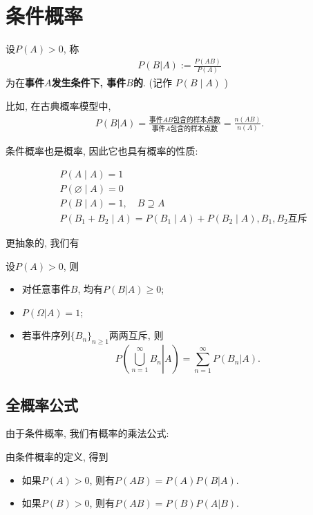 \section{条件概率}

\begin{definition}
    设$P(A)>0$, 称
    \begin{align*}
        P(B|A):=\frac{P(AB)}{P(A)}
    \end{align*}
    为在\textbf{事件$A$发生条件下, 事件$B$的}. (记作 $P(B \mid A)$ )
\end{definition}

比如, 在古典概率模型中, 
\begin{align*}
    P(B|A)=\frac{\mbox{事件$AB$包含的样本点数}}{\mbox{事件$A$包含的样本点数}}=\frac{n(AB)}{n(A)}.
\end{align*}

条件概率也是概率, 因此它也具有概率的性质:

$$
\begin{aligned}
& P(A \mid A)=1 \\
& P(\varnothing \mid A)=0 \\
& P(B \mid A)=1, \quad B \supseteq A \\
& P\left(B_1+B_2 \mid A\right)=P\left(B_1 \mid A\right)+P\left(B_2 \mid A\right), B_1,B_2\text{互斥}
\end{aligned}
$$

更抽象的, 我们有

\begin{proposition}
    设$P(A)>0$, 则
    \begin{itemize}
        \item 对任意事件$B$, 均有$P(B|A)\ge 0$; 
        \item $P(\Omega|A)=1$; 
        \item 若事件序列$\{B_n\}_{n\ge 1}$两两互斥, 则
              $$P\left( \left. \bigcup_{n=1}^{\infty} B_n \right| A\right)=\sum_{n=1}^{\infty} P(B_n|A).$$
    \end{itemize}
\end{proposition}



\subsection*{全概率公式}

由于条件概率, 我们有概率的乘法公式:

\begin{theorem}
    由条件概率的定义, 得到
    \begin{itemize}
        \item 如果$P(A)>0$, 则有$P(AB)=P(A)P(B|A)$. 
        \item 如果$P(B)>0$, 则有$P(AB)=P(B)P(A|B)$. 
    \end{itemize}
\end{theorem}

